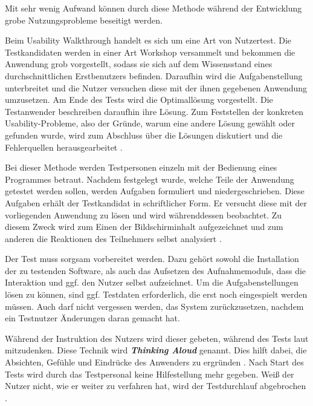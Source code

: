 Mit sehr wenig Aufwand können durch diese Methode während der Entwicklung grobe Nutzungsprobleme beseitigt werden.\par
{}
Beim Usability Walkthrough handelt es sich um eine Art von Nutzertest. Die Testkandidaten werden in einer Art Workshop versammelt und bekommen die Anwendung grob vorgestellt, sodass sie sich auf dem Wissensstand eines durchschnittlichen Erstbenutzers befinden. Daraufhin wird die Aufgabenstellung unterbreitet und die Nutzer versuchen diese mit der ihnen gegebenen Anwendung umzusetzen. Am Ende des Tests wird die Optimallösung vorgestellt. Die Testanwender beschreiben daraufhin ihre Lösung. Zum Feststellen der konkreten Usability-Probleme, also der Gründe, warum eine andere Lösung gewählt oder gefunden wurde, wird zum Abschluss über die Lösungen diskutiert und die Fehlerquellen herausgearbeitet \cite[S. 228]{Moser2012}.\par
{}
Bei dieser Methode werden Testpersonen einzeln mit der Bedienung eines Programmes betraut. Nachdem festgelegt wurde, welche Teile der Anwendung getestet werden sollen, werden Aufgaben formuliert und niedergeschrieben. Diese Aufgaben erhält der Testkandidat in schriftlicher Form. Er versucht diese mit der vorliegenden Anwendung zu lösen und wird währenddessen beobachtet. Zu diesem Zweck wird zum Einen der Bildschirminhalt aufgezeichnet und zum anderen die Reaktionen des Teilnehmers selbst analysiert \cite[S. 230]{Moser2012}.\par
Der Test muss sorgsam vorbereitet werden. Dazu gehört sowohl die Installation der zu testenden Software, als auch das Aufsetzen des Aufnahmemoduls, dass die Interaktion und ggf. den Nutzer selbst aufzeichnet. Um die Aufgabenstellungen lösen zu können, sind ggf. Testdaten erforderlich, die erst noch eingespielt werden müssen. Auch darf nicht vergessen werden, das System zurückzusetzen, nachdem ein Testnutzer Änderungen daran gemacht hat. \cite[S. 231]{Moser2012}\par
Während der Instruktion des Nutzers wird dieser gebeten, während des Tests laut mitzudenken. Diese Technik wird \textbf{\textit{Thinking Aloud}} genannt. Dies hilft dabei, die Absichten, Gefühle und Eindrücke des Anwenders zu ergründen \cite[S. 1]{Frommann2005}. Nach Start des Tests wird durch das Testpersonal keine Hilfestellung mehr gegeben. Weiß der Nutzer nicht, wie er weiter zu verfahren hat, wird der Testdurchlauf abgebrochen \cite[S. 231]{Moser2012}.
